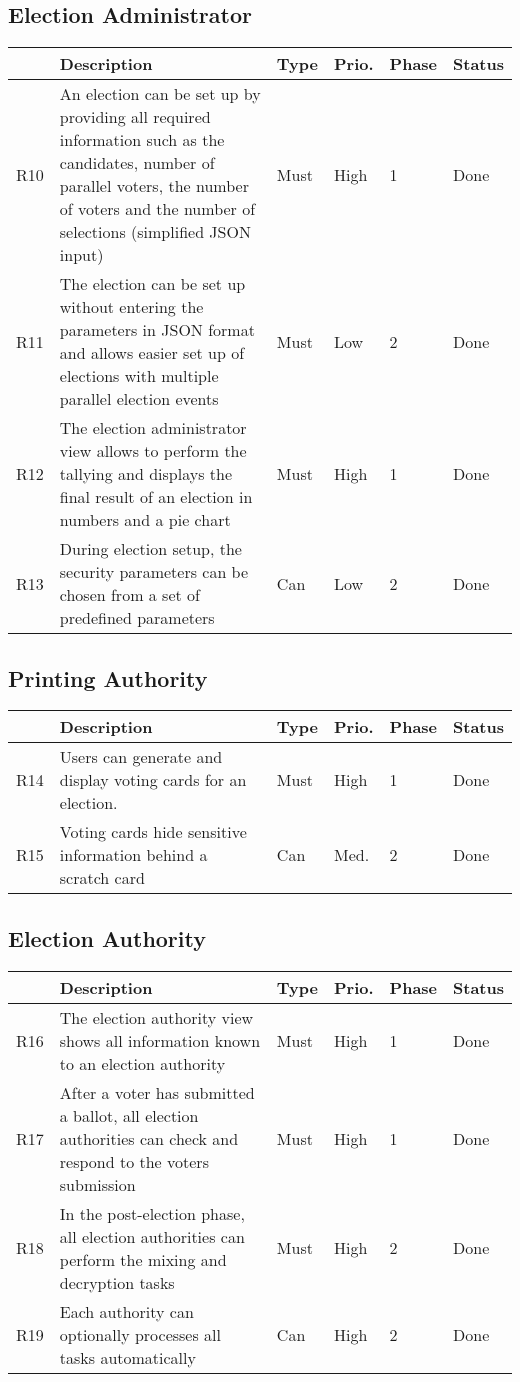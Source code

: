 \subsection{Election Administrator}
\begin{longtable}{p{0.5cm}p{9cm}p{1cm}p{1cm}p{1cm}p{1cm}}
\hline
 & Description & Type & Prio. & Phase & Status\\
\hline
R10 & An election can be set up by providing all required information such as the candidates, number of parallel voters, the number of voters and the number of selections (simplified JSON input) & Must & High & 1 & Done\\
R11 & The election can be set up without entering the parameters in JSON format and allows easier set up of elections with multiple parallel election events & Must & Low & 2 & Done\\
R12 & The election administrator view allows to perform the tallying and displays the final result of an election in numbers and a pie chart & Must & High & 1 & Done\\
R13 &  During election setup, the security parameters can be chosen from a set of predefined parameters & Can & Low & 2 & Done\\
\end{longtable}

\subsection{Printing Authority}
\begin{longtable}{p{0.5cm}p{9cm}p{1cm}p{1cm}p{1cm}p{1cm}}
\hline
 & Description & Type & Prio. & Phase & Status\\
\hline
R14 & Users can generate and display voting cards for an election. & Must & High & 1 & Done\\
R15 & Voting cards hide sensitive information behind a scratch card & Can & Med. & 2 & Done\\
\end{longtable}

\subsection{Election Authority}
\begin{longtable}{p{0.5cm}p{9cm}p{1cm}p{1cm}p{1cm}p{1cm}}
\hline
 & Description & Type & Prio. & Phase & Status\\
\hline
R16 & The election authority view shows all information known to an election authority & Must & High & 1 & Done\\
R17 & After a voter has submitted a ballot, all election authorities can check and respond to the voters submission & Must & High & 1 & Done\\
R18 & In the post-election phase, all election authorities can perform the mixing and decryption tasks & Must & High & 2 & Done\\
R19 & Each authority can optionally processes all tasks automatically & Can & High & 2 & Done\\
\end{longtable}


